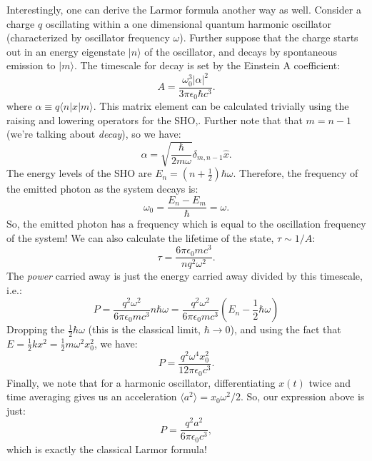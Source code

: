 \documentclass{article}
\begin{document}
Interestingly, one can derive the Larmor formula another way as well. Consider a charge $q$ oscillating within a one dimensional quantum harmonic oscillator (characterized by oscillator frequency $\omega$). Further suppose that the charge starts out in an energy eigenstate $|n\rangle$ of the oscillator, and decays by spontaneous emission to $|m\rangle$. The timescale for decay is set by the Einstein A coefficient:
\begin{equation}
A  = \frac{\omega_0^3 |\alpha|^2}{3\pi\epsilon_0 \hbar c^3}.
\end{equation}
where $\alpha \equiv q\langle n | x | m \rangle$. This matrix element can be calculated trivially using the raising and lowering operators for the SHO,. Further note that that $m = n-1$ (we're talking about \textit{decay}), so we have: 
\begin{equation}
\alpha = \sqrt{\frac{\hbar}{2m\omega}}\delta_{m, n-1} \hat{x}.
\end{equation}
The energy levels of the SHO are $E_n = (n+\frac{1}{2})\hbar\omega$. Therefore, the frequency of the emitted photon as the system decays is:
\begin{equation}
\omega_0 = \frac{E_n - E_m}{\hbar} = \omega.
\end{equation}
So, the emitted photon has a frequency which is equal to the oscillation frequency of the system! We can also calculate the lifetime of the state, $\tau \sim 1/A$:
\begin{equation}
\tau = \frac{6\pi\epsilon_0mc^3}{nq^2\omega^2}.
\end{equation}
The \textit{power} carried away is just the energy carried away divided by this timescale, i.e.:
\begin{equation}
P = \frac{q^2\omega^2}{6\pi\epsilon_0mc^3}n\hbar\omega = \frac{q^2\omega^2}{6\pi\epsilon_0mc^3}(E_n - \frac{1}{2}\hbar\omega)
\end{equation}
Dropping the $\frac{1}{2}\hbar\omega$ (this is the classical limit, $\hbar \rightarrow 0$), and using the fact that $E = \frac{1}{2}kx^2 = \frac{1}{2}m\omega^2x^2_0$, we have:
\begin{equation}
P =  \frac{q^2\omega^4x_0^2}{12\pi\epsilon_0c^3}.
\end{equation}
Finally, we note that for a harmonic oscillator, differentiating $x(t)$ twice and time averaging gives us an acceleration $\langle a^2 \rangle = x_0\omega^2/2$. So, our expression above is just:
\begin{equation}
P =  \frac{q^2a^2}{6\pi\epsilon_0c^3},
\end{equation}
which is exactly the classical Larmor formula!
\end{document}
